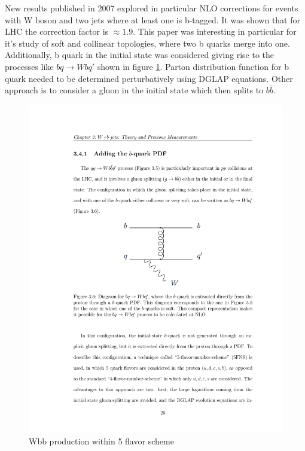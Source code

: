 \par New results published in 2007 explored in particular NLO corrections for events with W boson and two jets where at least one is b-tagged. It was shown that for LHC the correction factor is $\approx 1.9$. This paper was interesting in particular for it's study of soft and collinear topologies, where two b quarks merge into one. Additionally, b quark in the initial state was considered giving rise to the processes like $bq\rightarrow Wbq'$ shown in figure \ref{fig:5FS_diag}. Parton distribution function for b quark needed to be determined perturbatively using DGLAP equations. Other approach is to consider a gluon in the initial state which then splits to $b\bar{b}$. 
\begin{figure}[htbp]
	\centering
		\includegraphics{Figures/5FS_diag.pdf}
	\caption[Wbb production within 5 flavor scheme]{Wbb production within 5 flavor scheme}
	\label{fig:5FS_diag}
\end{figure}

